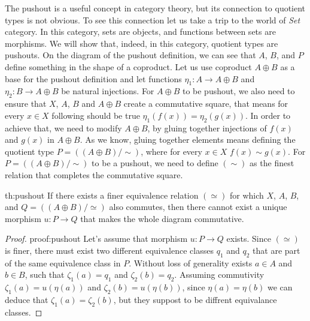 The pushout is a useful concept in category theory, but its connection to quotient types is not obvious. To see this connection let us take a trip to the world of \emph{Set} category. In this category, sets are objects, and functions between sets are morphisms. We will show that, indeed, in this category, quotient types are pushouts. On the diagram of the pushout definition, we can see that $A$, $B$, and $P$ define something in the shape of a coproduct. Let us use coproduct $A \oplus B$ as a base for the pushout definition and let functions $\eta_1: A \rightarrow A \oplus B$ and $\eta_2: B \rightarrow A \oplus B$ be natural injections. For $A \oplus B$ to be pushout, we also need to ensure that $X$, $A$, $B$ and $A \oplus B$ create a commutative square, that means for every $x \in X$ following should be true $\eta_1(f(x)) = \eta_2(g(x))$. In order to achieve that, we need to modify $A \oplus B$, by gluing together injections of $f(x)$ and $g(x)$ in $A \oplus B$. As we know, gluing together elements means defining the quotient type $P = ((A \oplus B) / \sim)$, where for every $x \in X$ $f(x) \sim g(x)$. For $P = ((A \oplus B) / \sim)$ to be a pushout, we need to define $(\sim)$ as the finest relation that completes the commutative square. 
\begin{theo}{}{th:pushout}
If there exists a finer equivalence relation $(\simeq)$ for which  $X$, $A$, $B$, and $Q = ((A \oplus B
)/\simeq)$ also commutes, then there cannot exist a unique morphism $u: P \rightarrow Q$ that makes the whole diagram commutative. 
\end{theo}

\begin{proof}{}{proof:pushout}
Let's assume that morphism $u: P \rightarrow Q$ exists. Since $(\simeq)$ is finer, there must exist two different equivalence classes $q_1$ and $q_2$ that are part of the same equivalence class in $P$. Without loss of generality exists $a \in A$ and $b \in B$, such that $\zeta_1(a) = q_1$ and $\zeta_2(b) = q_2$. Assuming commutivity $\zeta_1(a) = u(\eta(a))$ and $\zeta_2(b) = u(\eta(b))$, since $\eta(a) = \eta(b)$ we can deduce that $\zeta_1(a) = \zeta_2(b)$, but they suppost to be diffrent equivalance classes.
\end{proof}

